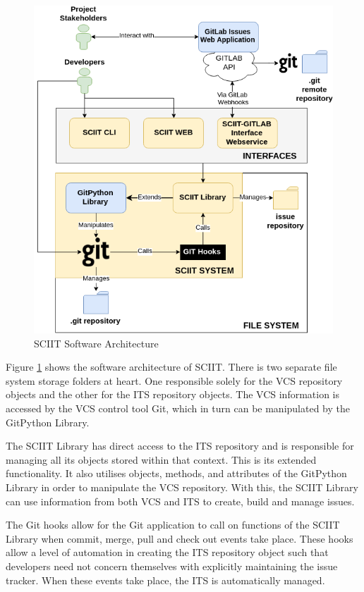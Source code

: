 \documentclass{mproj}
\begin{document}
\begin{figure}[h!]
\caption{SCIIT Software Architecture}
\label{fig:sciit-software-arch}
\centering
\includegraphics[width=12cm]{sciit-software-arch}
\end{figure}

Figure \ref{fig:sciit-software-arch} shows the software architecture of SCIIT. There is two separate file system storage folders at heart. One responsible solely for the VCS repository objects and the other for the ITS repository objects. The VCS information is accessed by the VCS control tool Git, which in turn can be manipulated by the GitPython Library.

The SCIIT Library has direct access to the ITS repository and is responsible for managing all its objects stored within that context. This is its extended functionality. It also utilises objects, methods, and attributes of the GitPython Library in order to manipulate the VCS repository. With this, the SCIIT Library can use information from both VCS and ITS to create, build and manage issues.

The Git hooks allow for the Git application to call on functions of the SCIIT Library when commit, merge, pull and check out events take place. These hooks allow a level of automation in creating the ITS repository object such that developers need not concern themselves with explicitly maintaining the issue tracker. When these events take place, the ITS is automatically managed.
\end{document}
